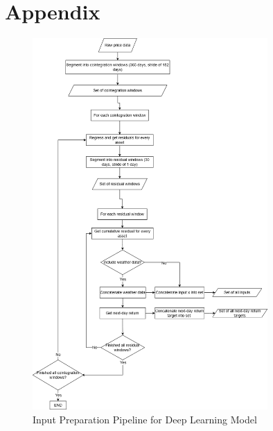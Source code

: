 \documentclass[12pt]{article}
\begin{document}
\section{Appendix}
\begin{figure}[H]
    \centering
    \includegraphics[width=0.8\textwidth]{figures/input_preparation_pipeline.drawio.png}
    \caption{Input Preparation Pipeline for Deep Learning Model}
    \label{fig:input_preparation_pipeline}
\end{figure}

\clearpage
\end{document}
